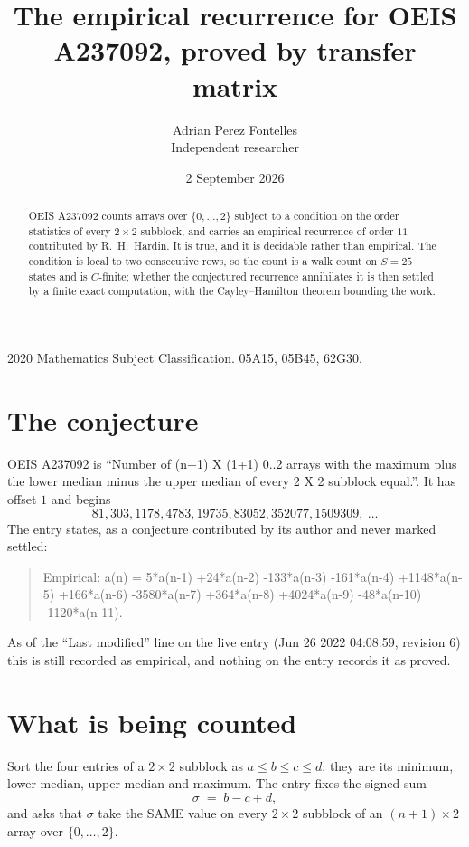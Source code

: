 \documentclass[11pt,a4paper]{article}
\title{The empirical recurrence for OEIS A237092, proved by transfer matrix}
\author{Adrian Perez Fontelles\\ \small Independent researcher}
\date{2 September 2026}
\theoremstyle{plain}
\theoremstyle{definition}
\begin{document}
\maketitle

\begin{abstract}
OEIS A237092 counts arrays over $\{0,\dots,2\}$ subject to a condition on the order
statistics of every $2\times2$ subblock, and carries an empirical recurrence of order
$11$ contributed by R.~H.~Hardin. It is true, and it is decidable rather than empirical.
The condition is local to two consecutive rows, so the count is a walk count on $S=25$
states and is $C$-finite; whether the conjectured recurrence annihilates it is then settled by
a finite exact computation, with the Cayley--Hamilton theorem bounding the work.
\end{abstract}

\noindent\small 2020 Mathematics Subject Classification. 05A15, 05B45, 62G30.\normalsize

\section{The conjecture}

OEIS A237092 is ``Number of (n+1) X (1+1) 0..2 arrays with the maximum plus the lower median minus the upper median of every 2 X 2 subblock equal.''. It has offset $1$ and begins
\[
81, 303, 1178, 4783, 19735, 83052, 352077, 1509309,\ \dots
\]
The entry states, as a conjecture contributed by its author and never marked settled:
\begin{quote}
Empirical: a(n) = 5*a(n-1) +24*a(n-2) -133*a(n-3) -161*a(n-4) +1148*a(n-5) +166*a(n-6) -3580*a(n-7) +364*a(n-8) +4024*a(n-9) -48*a(n-10) -1120*a(n-11).
\end{quote}
As of the ``Last modified'' line on the live entry (Jun 26 2022 04:08:59, revision 6) this is still
recorded as empirical, and nothing on the entry records it as proved.

\section{What is being counted}

Sort the four entries of a $2\times2$ subblock as $a\le b\le c\le d$: they
are its minimum, lower median, upper median and maximum. The entry fixes the signed sum
\[
\sigma\;=\;b-c+d,
\]
and asks that $\sigma$ take the SAME value on every $2\times2$ subblock of an
$(n+1)\times2$ array over $\{0,\dots,2\}$.
\end{document}
